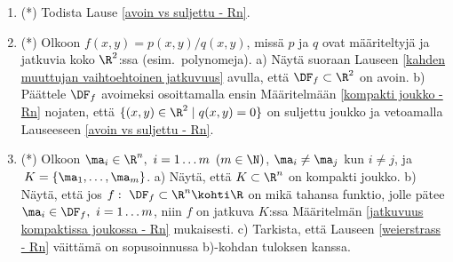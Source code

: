 \begin{enumerate}
\item (*) \label{H-udif-1: avoin vs suljettu}
Todista Lause \ref{avoin vs suljettu - Rn}.

\item (*)
Olkoon $f(x,y)=p(x,y)/q(x,y)$, missä $p$ ja $q$ ovat määriteltyjä ja jatkuvia koko $\R^2$:ssa
(esim.\ polynomeja). \vspace{1mm}\newline
a) Näytä suoraan Lauseen \ref{kahden muuttujan vaihtoehtoinen jatkuvuus} avulla, että
$\DF_f\subset\R^2$ on avoin. \vspace{1mm}\newline
b) Päättele $\DF_f$ avoimeksi osoittamalla ensin Määritelmään \ref{kompakti joukko - Rn}
nojaten, että $\{(x,y)\in\R^2 \mid q(x,y)=0\}$ on suljettu joukko ja vetoamalla Lauseeseen
\ref{avoin vs suljettu - Rn}.

\item (*) \label{H-udif-1: äärellinen joukko}
Olkoon $\ma_i\in\R^n,\ i=1 \ldots m\,\ (m\in\N)$, $\ma_i\neq\ma_j$ kun $i \neq j$, ja
$\,K=\{\ma_1,\ldots,\ma_m\}$. \vspace{1mm}\newline
a) Näytä, että $K\subset\R^n$ on kompakti joukko. \vspace{1mm}\newline
b) Näytä, että jos $f:\ \DF_f\subset\R^n\kohti\R$ on mikä tahansa funktio, jolle pätee
$\ma_i\in\DF_f,\ i=1 \ldots m$, niin $f$ on jatkuva $K$:ssa Määritelmän
\ref{jatkuvuus kompaktissa joukossa - Rn} mukaisesti. \vspace{1mm}\newline
c) Tarkista, että Lauseen \ref{weierstrass - Rn} väittämä on sopusoinnussa b)-kohdan tuloksen
kanssa.

\end{enumerate}